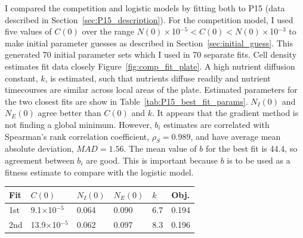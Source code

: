 \begin{multicols}{2}
I compared the competition and logistic models by fitting both to P15
(data described in Section~\ref{sec:P15_description}). For the
competition model, I used five values of \(C(0)\) over the range
\(N(0)\times\)10\(^{-5} < C(0) < N(0)\times\)10\(^{-3}\) to make
initial parameter guesses as described in
Section~\ref{sec:initial_guess}. This generated 70 initial parameter
sets which I used in 70 separate fits. Cell density estimates fit data
closely Figure~\ref{fig:comp_fit_plate}.
A high nutrient diffusion constant, \(k\), is estimated, such that
nutrients diffuse readily and nutrient timecourses are similar across
local areas of the plate. Estimated parameters for the two closest
fits are show in Table~\ref{tab:P15_best_fit_params}. \(N_{I}(0)\) and
\(N_{E}(0)\) agree better than \(C(0)\) and \(k\). It appears that the
gradient method is not finding a global minimum. However, \(b_{i}\)
estimates are correlated with Spearman's rank correlation coefficient,
\(\rho_{S} = 0.989\), and have average mean absolute deviation,
\(MAD = 1.56\). The mean value of \(b\) for the best fit is 44.4, so
agreement between \(b_{i}\) are good. This is important because \(b\)
is to be used as a fitness estimate to compare with the logistic
model.
\begin{center}
  \begin{tabular}{l l l l l l}
    \hline
    Fit     & \(C(0)\)                    & \(N_{I}(0)\) & \(N_{E}(0)\) & \(k\) & Obj.\\
    \hline
    1st     & 9.1\(\times\)10\(^{-5}\)    & 0.064      & 0.090       & 6.7  & 0.194 \\
    2nd     & 13.9\(\times\)10\(^{-5}\)   & 0.062      & 0.097       & 8.3  & 0.196 \\
    \hline
  \end{tabular}
  \label{tab:P15_best_fit_params}
\end{center}

\end{multicols}
